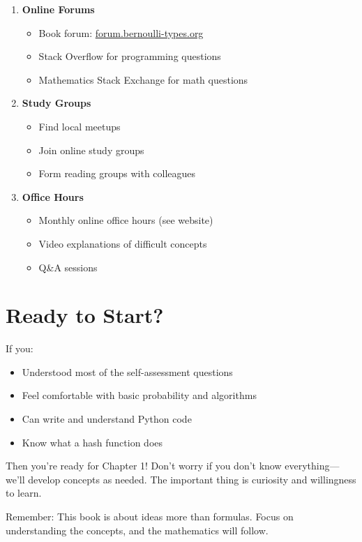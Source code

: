 \begin{enumerate}
\item \textbf{Online Forums}
    \begin{itemize}
    \item Book forum: \url{forum.bernoulli-types.org}
    \item Stack Overflow for programming questions
    \item Mathematics Stack Exchange for math questions
    \end{itemize}

\item \textbf{Study Groups}
    \begin{itemize}
    \item Find local meetups
    \item Join online study groups
    \item Form reading groups with colleagues
    \end{itemize}

\item \textbf{Office Hours}
    \begin{itemize}
    \item Monthly online office hours (see website)
    \item Video explanations of difficult concepts
    \item Q\&A sessions
    \end{itemize}
\end{enumerate}

\section{Ready to Start?}

If you:
\begin{itemize}
\item Understood most of the self-assessment questions
\item Feel comfortable with basic probability and algorithms
\item Can write and understand Python code
\item Know what a hash function does
\end{itemize}

Then you're ready for Chapter 1! Don't worry if you don't know everything—we'll develop concepts as needed. The important thing is curiosity and willingness to learn.

Remember: This book is about ideas more than formulas. Focus on understanding the concepts, and the mathematics will follow.